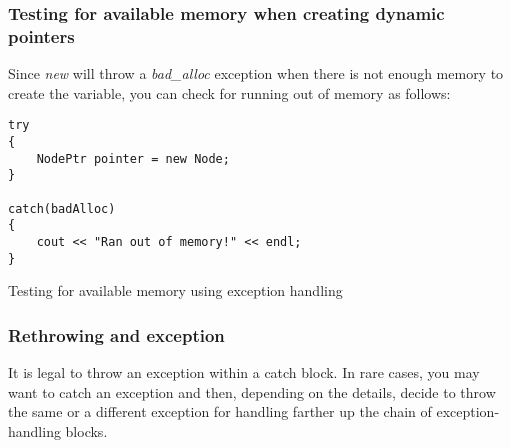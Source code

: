 \subsubsection*{Testing for available memory when creating dynamic pointers}
Since \emph{new} will throw a \emph{bad\_alloc} exception when there is not enough memory to create the
variable, you can check for running out of memory as follows:

\begin{listing}[H]
\begin{verbatim}
try
{
	NodePtr pointer = new Node;
}

catch(badAlloc)
{
	cout << "Ran out of memory!" << endl;
}
\end{verbatim}
\caption{Testing for available memory using exception handling}
\label{source_code_1}
\end{listing}

\subsubsection*{Rethrowing and exception}
It is legal to throw an exception within a catch block. In rare cases, you may want to catch an exception
and then, depending on the details, decide to throw the same or a different exception for handling farther
up the chain of exception-handling blocks.